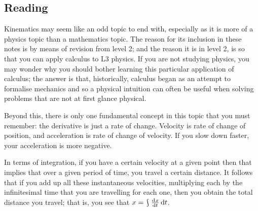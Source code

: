 


\subsection*{Reading}
Kinematics may seem like an odd topic to end with, especially as it is more of a physics topic than a mathematics topic. The
reason for its inclusion in these notes is by means of revision from level 2; and the reason it is in level 2, is so that you
can apply calculus to L3 physics. If you are not studying physics, you may wonder why you should bother learning this particular
application of calculus; the answer is that, historically, calculus began as an attempt to formalise mechanics and so a physical
intuition can often be useful when solving problems that are not at first glance physical.

Beyond this, there is only one fundamental concept in this topic that you must remember: the derivative is just a rate of
change. Velocity is rate of change of position, and acceleration is rate of change of velocity. If you slow down faster,
your acceleration is more negative.

In terms of integration, if you have a certain velocity at a given point then that implies that over a given period of
time, you travel a certain distance. It follows that if you add up all these instantaneous velocities, multiplying each
by the infinitesimal time that you are travelling for each one, then you obtain the total distance you travel; that is,
you see that $ x = \rint \od{x}{t} \dif{t} $.

